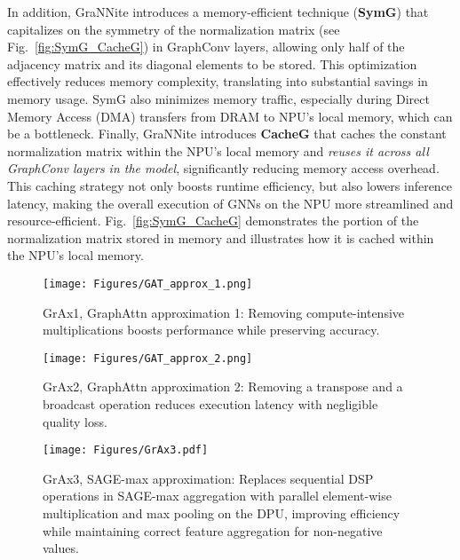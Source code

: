 In addition, GraNNite introduces a memory-efficient technique (\textbf{SymG}) that capitalizes on the symmetry of the normalization matrix (see Fig.~\ref{fig:SymG_CacheG}) in GraphConv layers, allowing only half of the adjacency matrix and its diagonal elements to be stored. This optimization effectively reduces memory complexity, translating into substantial savings in memory usage. SymG also minimizes memory traffic, especially during Direct Memory Access (DMA) transfers from DRAM to NPU’s local memory, which can be a bottleneck.
Finally, GraNNite introduces \textbf{CacheG} that caches the constant normalization matrix within the NPU’s local memory and \textit{reuses it across all GraphConv layers in the model}, significantly reducing memory access overhead. This caching strategy not only boosts runtime efficiency, but also lowers inference latency, making the overall execution of GNNs on the NPU more streamlined and resource-efficient. Fig.~\ref{fig:SymG_CacheG} demonstrates the portion of the normalization matrix stored in memory and illustrates how it is cached within the NPU’s local memory.


\begin{figure}[t!]
\begin{center}
\texttt{[image: Figures/GAT\_approx\_1.png]}%
\end{center}
\caption{GrAx1, GraphAttn approximation 1: Removing compute-intensive multiplications boosts performance while preserving accuracy.}\label{fig:GrAx1}
\end{figure}


\begin{figure}[t!]
\begin{center}
\texttt{[image: Figures/GAT\_approx\_2.png]}%
\end{center}
\caption{GrAx2, GraphAttn approximation 2: Removing a transpose and a broadcast operation reduces execution latency with negligible quality loss.}\label{fig:GrAx2}
\end{figure}

\begin{figure}[t!]
\begin{center}
\texttt{[image: Figures/GrAx3.pdf]}%
\end{center}
\caption{GrAx3, SAGE-max approximation: Replaces sequential DSP operations in SAGE-max aggregation with parallel element-wise multiplication and max pooling on the DPU, improving efficiency while maintaining correct feature aggregation for non-negative values.}\label{fig:GrAx3}
\end{figure}




